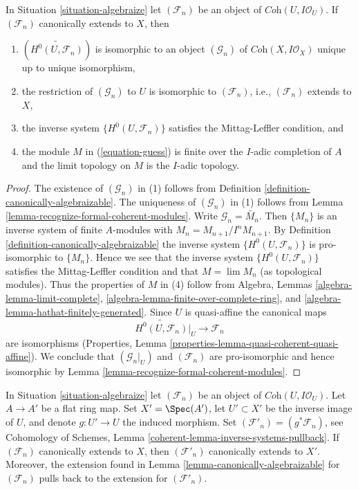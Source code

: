 \begin{lemma}
\label{lemma-canonically-algebraizable}
In Situation \ref{situation-algebraize} let $(\mathcal{F}_n)$ be an
object of $\textit{Coh}(U, I\mathcal{O}_U)$. If $(\mathcal{F}_n)$
canonically extends to $X$, then
\begin{enumerate}
\item $(\widetilde{H^0(U, \mathcal{F}_n)})$ is isomorphic to an
object $(\mathcal{G}_n)$ of $\textit{Coh}(X, I \mathcal{O}_X)$
unique up to unique isomorphism,
\item the restriction of $(\mathcal{G}_n)$ to $U$ is isomorphic
to $(\mathcal{F}_n)$, i.e., $(\mathcal{F}_n)$ extends to $X$,
\item the inverse system $\{H^0(U, \mathcal{F}_n)\}$
satisfies the Mittag-Leffler condition, and
\item the module $M$ in (\ref{equation-guess}) is finite over the
$I$-adic completion of $A$ and the limit topology on
$M$ is the $I$-adic topology.
\end{enumerate}
\end{lemma}

\begin{proof}
The existence of $(\mathcal{G}_n)$ in (1) follows from
Definition \ref{definition-canonically-algebraizable}.
The uniqueness of $(\mathcal{G}_n)$ in (1) follows from
Lemma \ref{lemma-recognize-formal-coherent-modules}.
Write $\mathcal{G}_n = \widetilde{M_n}$.
Then $\{M_n\}$ is an inverse system of finite $A$-modules
with $M_n = M_{n + 1}/I^n M_{n + 1}$.
By Definition \ref{definition-canonically-algebraizable}
the inverse system $\{H^0(U, \mathcal{F}_n)\}$
is pro-isomorphic to $\{M_n\}$.
Hence we see that the inverse system $\{H^0(U, \mathcal{F}_n)\}$
satisfies the Mittag-Leffler condition and that
$M = \lim M_n$ (as topological modules).
Thus the properties of $M$ in (4) follow from
Algebra, Lemmas \ref{algebra-lemma-limit-complete},
\ref{algebra-lemma-finite-over-complete-ring}, and
\ref{algebra-lemma-hathat-finitely-generated}.
Since $U$ is quasi-affine the canonical maps
$$
\widetilde{H^0(U, \mathcal{F}_n)}|_U \to \mathcal{F}_n
$$
are isomorphisms (Properties, Lemma
\ref{properties-lemma-quasi-coherent-quasi-affine}).
We conclude that $(\mathcal{G}_n|_U)$ and $(\mathcal{F}_n)$ are
pro-isomorphic and hence isomorphic by
Lemma \ref{lemma-recognize-formal-coherent-modules}.
\end{proof}

\begin{lemma}
\label{lemma-canonically-extend-base-change}
In Situation \ref{situation-algebraize} let $(\mathcal{F}_n)$ be an
object of $\textit{Coh}(U, I\mathcal{O}_U)$. Let $A \to A'$ be a flat ring
map. Set $X' = \Spec(A')$, let $U' \subset X'$ be the inverse image of $U$,
and denote $g : U' \to U$ the induced morphism. Set
$(\mathcal{F}'_n) = (g^*\mathcal{F}_n)$, see
Cohomology of Schemes, Lemma \ref{coherent-lemma-inverse-systems-pullback}.
If $(\mathcal{F}_n)$ canonically extends to $X$, then
$(\mathcal{F}'_n)$ canonically extends to $X'$.
Moreover, the extension found in Lemma \ref{lemma-canonically-algebraizable}
for $(\mathcal{F}_n)$ pulls back to the extension for
$(\mathcal{F}'_n)$.
\end{lemma}

